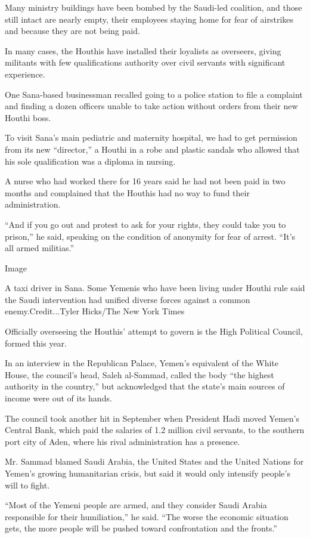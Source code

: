 Many ministry buildings have been bombed by the Saudi-led coalition, and
those still intact are nearly empty, their employees staying home for
fear of airstrikes and because they are not being paid.

In many cases, the Houthis have installed their loyalists as overseers,
giving militants with few qualifications authority over civil servants
with significant experience.

One Sana-based businessman recalled going to a police station to file a
complaint and finding a dozen officers unable to take action without
orders from their new Houthi boss.

To visit Sana's main pediatric and maternity hospital, we had to get
permission from its new ``director,'' a Houthi in a robe and plastic
sandals who allowed that his sole qualification was a diploma in
nursing.

A nurse who had worked there for 16 years said he had not been paid in
two months and complained that the Houthis had no way to fund their
administration.

``And if you go out and protest to ask for your rights, they could take
you to prison,'' he said, speaking on the condition of anonymity for
fear of arrest. ``It's all armed militias.''

Image

A taxi driver in Sana. Some Yemenis who have been living under Houthi
rule said the Saudi intervention had unified diverse forces against a
common enemy.Credit...Tyler Hicks/The New York Times

Officially overseeing the Houthis' attempt to govern is the High
Political Council, formed this year.

In an interview in the Republican Palace, Yemen's equivalent of the
White House, the council's head, Saleh al-Sammad, called the body ``the
highest authority in the country,'' but acknowledged that the state's
main sources of income were out of its hands.

The council took another hit in September when President Hadi moved
Yemen's Central Bank, which paid the salaries of 1.2 million civil
servants, to the southern port city of Aden, where his rival
administration has a presence.

Mr. Sammad blamed Saudi Arabia, the United States and the United Nations
for Yemen's growing humanitarian crisis, but said it would only
intensify people's will to fight.

``Most of the Yemeni people are armed, and they consider Saudi Arabia
responsible for their humiliation,'' he said. ``The worse the economic
situation gets, the more people will be pushed toward confrontation and
the fronts.''


